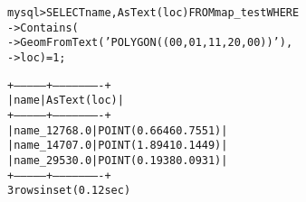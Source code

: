 \begin{alltt}
 mysql> SELECT name, AsText(loc) FROM map_test WHERE
    -> Contains( 
    -> GeomFromText('POLYGON((0 0, 0 1, 1 1, 2 0, 0 0))'), 
    -> loc) = 1;

+--------------+----------------------+
| name         | AsText(loc)          |
+--------------+----------------------+
| name_12768.0 | POINT(0.6646 0.7551) |
| name_14707.0 | POINT(1.8941 0.1449) |
| name_29530.0 | POINT(0.1938 0.0931) |
+--------------+----------------------+
3 rows in set (0.12 sec)
\end{alltt}